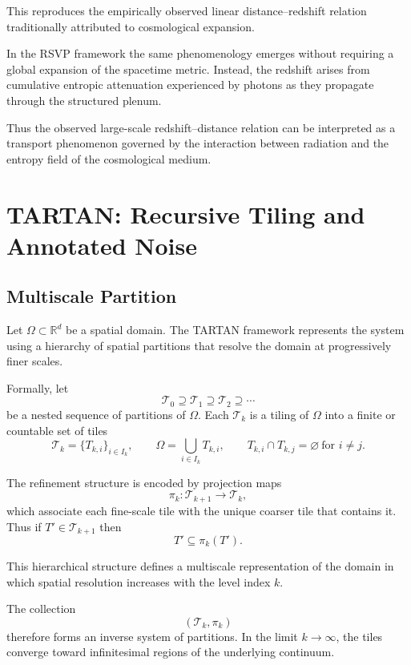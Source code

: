 \documentclass[11pt, openany]{book}
\theoremstyle{plain}
\theoremstyle{definition}
\theoremstyle{remark}
\begin{document}
This reproduces the empirically observed linear distance–redshift
relation traditionally attributed to cosmological expansion.

In the RSVP framework the same phenomenology emerges without requiring a
global expansion of the spacetime metric.  Instead, the redshift arises
from cumulative entropic attenuation experienced by photons as they
propagate through the structured plenum.

Thus the observed large-scale redshift–distance relation can be
interpreted as a transport phenomenon governed by the interaction
between radiation and the entropy field of the cosmological medium.

\chapter{TARTAN: Recursive Tiling and Annotated Noise}

\section{Multiscale Partition}

Let $\Omega\subset\mathbb{R}^d$ be a spatial domain.  The TARTAN framework
represents the system using a hierarchy of spatial partitions that
resolve the domain at progressively finer scales.

Formally, let
\[
\mathcal{T}_0 \supseteq \mathcal{T}_1 \supseteq \mathcal{T}_2 \supseteq \cdots
\]
be a nested sequence of partitions of $\Omega$.  Each $\mathcal{T}_k$
is a tiling of $\Omega$ into a finite or countable set of tiles
\[
\mathcal{T}_k=\{T_{k,i}\}_{i\in I_k},
\qquad
\Omega=\bigcup_{i\in I_k} T_{k,i},
\qquad
T_{k,i}\cap T_{k,j}=\varnothing\ \text{for }i\neq j.
\]

The refinement structure is encoded by projection maps
\[
\pi_k:\mathcal{T}_{k+1}\to\mathcal{T}_k,
\]
which associate each fine-scale tile with the unique coarser tile that
contains it.  Thus if $T'\in\mathcal{T}_{k+1}$ then
\[
T'\subseteq \pi_k(T').
\]

This hierarchical structure defines a multiscale representation of the
domain in which spatial resolution increases with the level index $k$.

\medskip

The collection
\[
(\mathcal{T}_k,\pi_k)
\]
therefore forms an inverse system of partitions.  In the limit
$k\to\infty$, the tiles converge toward infinitesimal regions of the
underlying continuum.
\end{document}
